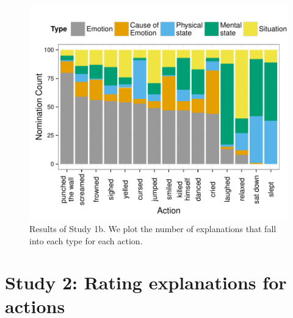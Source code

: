 \documentclass[10pt,letterpaper]{article}
\begin{document}
\begin{figure}[htb!]
\begin{center}\includegraphics[width=1\columnwidth]{images/study1b_codePlot.pdf}\end{center}
\caption{ Results of Study 1b. We plot the number of explanations that fall into each type for each action. }
\label{Study1bResultsFig}
\end{figure}


\section{Study 2: Rating explanations for actions}
\end{document}
